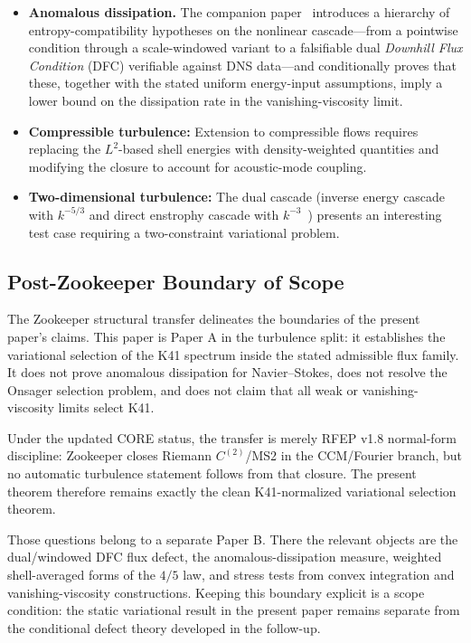 \documentclass[12pt,a4paper]{article}
\theoremstyle{definition}
\theoremstyle{plain}
\theoremstyle{remark}
\begin{document}
\begin{itemize}
  \item \textbf{Anomalous dissipation.}\;
    The companion paper~\cite{Geiger2026b} introduces a hierarchy of
    entropy-compatibility hypotheses on the nonlinear cascade---from a
    pointwise condition through a scale-windowed variant to a falsifiable
    dual \emph{Downhill Flux Condition} (DFC) verifiable against DNS data---and
    conditionally proves that these, together with the stated uniform
    energy-input assumptions, imply a lower bound on the dissipation rate
    in the vanishing-viscosity limit.
  \item \textbf{Compressible turbulence:}
    Extension to compressible flows requires replacing the $L^2$-based
    shell energies with density-weighted quantities and modifying the
    closure to account for acoustic-mode coupling.
  \item \textbf{Two-dimensional turbulence:}
    The dual cascade (inverse energy cascade with $k^{-5/3}$ and direct
    enstrophy cascade with $k^{-3}$~\cite{Kraichnan67}) presents an
    interesting test case requiring a two-constraint variational problem.
\end{itemize}

\subsection{Post-Zookeeper Boundary of Scope}
\label{subsec:zookeeper-k41-scope}

The Zookeeper structural transfer delineates the boundaries of the present
paper's claims. This paper is Paper A in the turbulence split: it establishes the
variational selection of the K41 spectrum inside the stated admissible
flux family.  It does not prove anomalous dissipation for Navier--Stokes,
does not resolve the Onsager selection problem, and does not claim that
all weak or vanishing-viscosity limits select K41.

Under the updated CORE status, the transfer is merely RFEP v1.8
normal-form discipline: Zookeeper closes Riemann $C^{(2)}$/MS2 in the
CCM/Fourier branch, but no automatic turbulence statement follows from
that closure.  The present theorem therefore remains exactly the clean
K41-normalized variational selection theorem.

Those questions belong to a separate Paper B.  There the relevant objects
are the dual/windowed DFC flux defect, the anomalous-dissipation measure,
weighted shell-averaged forms of the $4/5$ law, and stress tests from convex integration and
vanishing-viscosity constructions.  Keeping this boundary explicit is a
scope condition: the static variational result in the present paper remains
separate from the conditional defect theory developed in the follow-up.
\end{document}
